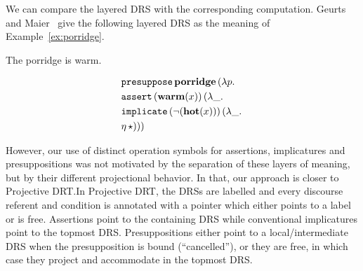 We can compare the layered DRS with the corresponding computation. Geurts
and Maier~\cite{geurts2003layered} give the following layered DRS as the
meaning of Example~\ref{ex:porridge}.

\begin{exe}
  \ex The porridge is warm. \label{ex:porridge}
\end{exe}

\begin{minipage}{.4\textwidth}
\end{minipage}
\begin{minipage}{.4\textwidth}
  \vspace*{-4mm}
  \begin{center}
  \begin{align*}
    &\mathtt{presuppose}\,\textbf{porridge}\,(\lambda p.\,  \\
    &\mathtt{assert}\,(\textbf{warm}(x))\,(\lambda \_.\,  \\
    &\mathtt{implicate}\,(\lnot (\textbf{hot}(x)))\,(\lambda \_.\,  \\
    &\eta\,\star)))
  \end{align*}
  \end{center}
\end{minipage}

\vspace*{3mm}

However, our use of distinct operation symbols for assertions, implicatures
and presuppositions was not motivated by the separation of these layers of
meaning, but by their different projectional behavior. In that, our
approach is closer to Projective DRT.\@ In Projective DRT, the DRSs are
labelled and every discourse referent and condition is annotated with a
pointer which either points to a label or is free. Assertions point to the
containing DRS while conventional implicatures point to the topmost DRS.\@
Presuppositions either point to a local/intermediate DRS when the
presupposition is bound (``cancelled''), or they are free, in which case
they project and accommodate in the topmost DRS.

